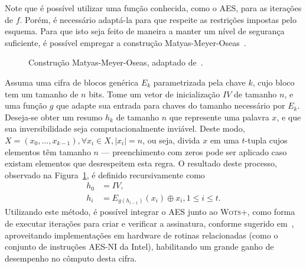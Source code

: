 \documentclass[12pt,notitlepage]{report}
\newcommand{\length}[1]{\vert #1 \vert}
\begin{document}
Note que é possível utilizar uma função conhecida, como o AES, para as
iterações de $f$. Porém, é necessário adaptá-la para que respeite as
restrições impostas pelo esquema. Para que isto seja feito de maneira
a manter um nível de segurança suficiente, é possível empregar a construção
Matyas-Meyer-Oseas~\cite[9.41]{Menezes:1996:HAC:548089}.

\begin{figure}[ht]
  \centering
  \caption{Construção Matyas-Meyer-Oseas,
    adaptado de~\cite{TikZ:for:Cryptographers}.}
  \label{fig:6}
\end{figure}

Assuma uma cifra de blocos genérica $E_{k}$ parametrizada pela chave $k$, cujo
bloco tem um tamanho de $n$ bits. Tome um vetor de inicialização $IV$ de
tamanho $n$, e uma função $g$ que adapte sua entrada para chaves do tamanho
necessário por $E_{k}$. Deseja-se obter um resumo $h_k$ de tamanho $n$ que
represente uma palavra $x$, e que sua inversibilidade seja computacionalmente
inviável. Deste modo, $X = (x_0, \dots, x_{k - 1}), \forall x_i \in X,
\length{x_i} = n$, ou seja, divida $x$ em uma $t$-tupla cujos elementos têm
tamanho $n$ --- preenchimento com zeros pode ser aplicado caso existam
elementos que desrespeitem esta regra. O resultado deste processo, observado
na Figura~\ref{fig:6}, é definido recursivamente como
\begin{equation}
    \begin{split}
        h_0 &= IV, \\
        h_i &= E_{g(h_{i-1})}(x_i) \oplus x_i, 1 \leq i \leq t.
    \end{split}
\end{equation}
Utilizando este método, é possível integrar o AES junto ao \textsc{Wots+}, como
forma de executar iterações para criar e verificar a assinatura, conforme
sugerido em~\cite[4.1]{Hlsing2013}, aproveitando implementações em
hardware de rotinas relacionadas (como o conjunto de instruções AES-NI da
Intel), habilitando um grande ganho de desempenho no cômputo desta cifra.
\end{document}
